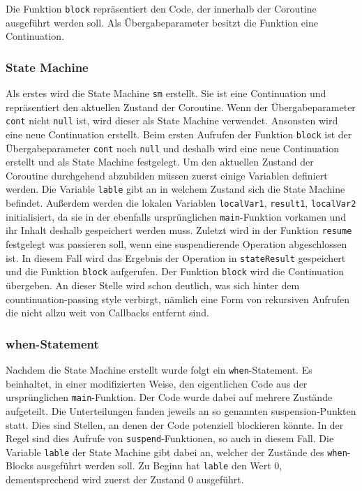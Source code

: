 \documentclass[fontsize=12pt,paper=a4,twoside=semi,parskip=half-,headsepline,headinclude]{scrreprt}
\begin{document}
Die Funktion \texttt{block} repräsentiert den Code, der innerhalb der Coroutine ausgeführt werden soll. Als Übergabeparameter besitzt die Funktion eine Continuation.

\subsubsection{State Machine}

Als erstes wird die State Machine \texttt{sm} erstellt. Sie ist eine Continuation und repräsentiert den aktuellen Zustand der Coroutine\cite{Elizarov2021}. Wenn der Übergabeparameter \texttt{cont} nicht \texttt{null} ist, wird dieser als State Machine verwendet. Ansonsten wird eine neue Continuation erstellt. Beim ersten Aufrufen der Funktion \texttt{block} ist der Übergabeparameter \texttt{cont} noch \texttt{null} und deshalb wird eine neue Continuation erstellt und als State Machine festgelegt. Um den aktuellen Zustand der Coroutine durchgehend abzubilden müssen zuerst einige Variablen definiert werden.  Die Variable \texttt{lable} gibt an in welchem Zustand sich die State Machine befindet. Außerdem werden die lokalen Variablen \texttt{localVar1}, \texttt{result1}, \texttt{localVar2} initialisiert, da sie in der ebenfalls ursprünglichen \texttt{main}-Funktion vorkamen und ihr Inhalt deshalb gespeichert werden muss. Zuletzt wird in der Funktion \texttt{resume} festgelegt was passieren soll, wenn eine suspendierende Operation abgeschlossen ist. In diesem Fall wird das Ergebnis der Operation in \texttt{stateResult} gespeichert und die Funktion \texttt{block} aufgerufen. Der Funktion \texttt{block} wird die Continuation übergeben. An dieser Stelle wird schon deutlich, was sich hinter dem countinuation-passing style verbirgt, nämlich eine Form von rekursiven Aufrufen die nicht allzu weit von Callbacks entfernt sind.

\subsubsection{when-Statement}

Nachdem die State Machine erstellt wurde folgt ein \texttt{when}-Statement. Es beinhaltet, in einer modifizierten Weise, den eigentlichen Code aus der ursprünglichen \texttt{main}-Funktion. Der Code wurde dabei auf mehrere Zustände aufgeteilt. Die Unterteilungen fanden jeweils an so genannten suspension-Punkten statt. Dies sind Stellen, an denen der Code potenziell blockieren könnte. In der Regel sind dies Aufrufe von \texttt{suspend}-Funktionen, so auch in diesem Fall. Die Variable \texttt{lable} der State Machine gibt dabei an, welcher der Zustände des \texttt{when}-Blocks ausgeführt werden soll. Zu Beginn hat \texttt{lable} den Wert 0, dementsprechend wird zuerst der Zustand 0 ausgeführt. 
\end{document}
